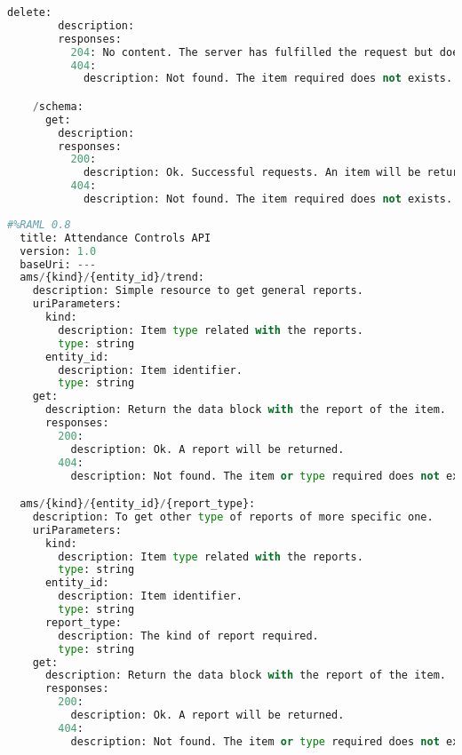 \begin{lstlisting}[language=python,frame=none]
      delete:
        description:
        responses:
          204: No content. The server has fulfilled the request but does not need to return an entity-body.
          404:
            description: Not found. The item required does not exists.

    /schema:
      get:
        description:
        responses:
          200:
            description: Ok. Successful requests. An item will be returned.
          404:
            description: Not found. The item required does not exists.

\end{lstlisting}


\begin{lstlisting}[language=python,frame=none]
  #%RAML 0.8
  title: Attendance Controls API
  version: 1.0
  baseUri: ---
  ams/{kind}/{entity_id}/trend:
    description: Simple resource to get general reports.
    uriParameters:
      kind:
        description: Item type related with the reports.
        type: string
      entity_id:
        description: Item identifier.
        type: string
    get:
      description: Return the data block with the report of the item.
      responses:
        200:
          description: Ok. A report will be returned.
        404:
          description: Not found. The item or type required does not exists.

  ams/{kind}/{entity_id}/{report_type}:
    description: To get other type of reports of more specific one.
    uriParameters:
      kind:
        description: Item type related with the reports.
        type: string
      entity_id:
        description: Item identifier.
        type: string
      report_type:
        description: The kind of report required.
        type: string
    get:
      description: Return the data block with the report of the item.
      responses:
        200:
          description: Ok. A report will be returned.
        404:
          description: Not found. The item or type required does not exists.

\end{lstlisting}
